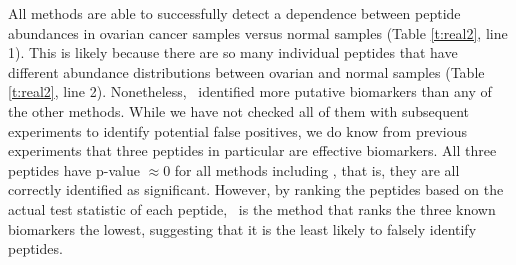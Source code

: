 \documentclass[11pt]{extarticle}
\begin{document}
All methods are able to successfully detect a dependence between peptide abundances in ovarian cancer samples versus normal samples (Table \ref{t:real2}, line 1). This is likely because there are so many individual peptides that have different abundance distributions between ovarian and normal samples (Table \ref{t:real2}, line 2).  Nonetheless, \Mgc~identified more putative biomarkers than any of the other methods.  While we have not checked all of them with subsequent experiments to identify potential false positives, we do know from previous experiments that three peptides in particular are effective biomarkers.
%
%
%
All three peptides have p-value $\approx 0$ for all methods including \Mgc, that is, they are all correctly identified as significant.
However, by ranking the peptides based on the actual test statistic of each peptide,
\Mgc~is the method that ranks the three known biomarkers the lowest, suggesting that it is the least likely to falsely identify peptides.
\end{document}
